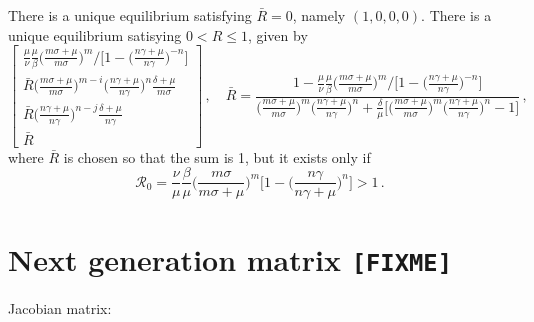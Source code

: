 \documentclass[fleqn]{article}
\begin{document}
There is a unique equilibrium satisfying $\bar{R} = 0$,
namely $(1, 0, 0, 0)$.
There is a unique equilibrium satisying $0 < R \leq 1$, given by
\begin{equation}
\begin{bmatrix}
  \frac{\mu}{\nu} \frac{\mu}{\beta} \big(\frac{m \sigma + \mu}{m \sigma}\big)^{m} \big/ \big[1 - \big(\frac{n \gamma + \mu}{n \gamma}\big)^{-n}\big] \\
  \bar{R} \big(\frac{m \sigma + \mu}{m \sigma}\big)^{m - i} \big(\frac{n \gamma + \mu}{n \gamma}\big)^{n} \frac{\delta + \mu}{m \sigma} \\
  \bar{R} \big(\frac{n \gamma + \mu}{n \gamma}\big)^{n - j} \frac{\delta + \mu}{n \gamma} \\
  \bar{R}
\end{bmatrix}
\,,\quad
\bar{R} = \frac{1 - \frac{\mu}{\nu} \frac{\mu}{\beta} \big(\frac{m \sigma + \mu}{m \sigma}\big)^{m} \big/ \big[1 - \big(\frac{n \gamma + \mu}{n \gamma}\big)^{-n}\big]}{\big(\frac{m \sigma + \mu}{m \sigma}\big)^{m} \big(\frac{n \gamma + \mu}{n \gamma}\big)^{n} + \frac{\delta}{\mu} \big[\big(\frac{m \sigma + \mu}{m \sigma}\big)^{m} \big(\frac{n \gamma + \mu}{n \gamma}\big)^{n} - 1\big]}\,,
\end{equation}
where $\bar{R}$ is chosen so that the sum is 1, but it exists only if
\begin{equation}
\mathcal{R}_{0} = \frac{\nu}{\mu} \frac{\beta}{\mu} \Big(\frac{m \sigma}{m \sigma + \mu}\Big)^{m} \Big[1 - \Big(\frac{n \gamma}{n \gamma + \mu}\Big)^{n}\Big] > 1\,.
\end{equation}
\clearpage


\section{Next generation matrix \texttt{[FIXME]}}

Jacobian matrix:
\end{document}
